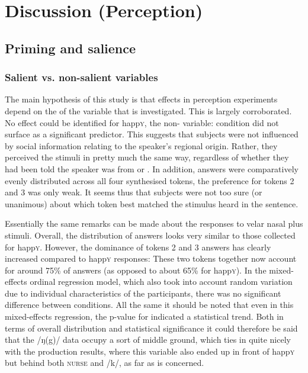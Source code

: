 	\chapter{Discussion (Perception)}
	\label{ch.perc_disc}

	\section{Priming and salience}
		\label{sec.perc_res.disc.salience}

		\subsection{Salient vs. non-salient variables}
		
The main hypothesis of this study is that  effects in perception experiments depend on the  of the variable that is investigated.
This is largely corroborated.
No  effect could be identified for happ\textsc{y}, the non-  variable:  condition did not surface as a significant predictor.
This suggests that subjects were not influenced by social information relating to the speaker's regional origin.
Rather, they perceived the stimuli in pretty much the same way, regardless of whether they had been told the speaker was from  or .
In addition, answers were comparatively evenly distributed across all four synthesised tokens, the preference for tokens 2 and 3 was only weak.
It seems thus that subjects were not too sure (or unanimous) about which token best matched the stimulus heard in the sentence.

Essentially the same remarks can be made about the responses to velar nasal plus stimuli.
Overall, the distribution of answers looks very similar to those collected for happ\textsc{y}.
However, the dominance of tokens 2 and 3 answers has clearly increased compared to happ\textsc{y} responses: These two tokens together now account for around 75\% of answers (as opposed to about 65\% for happ\textsc{y}).
In the mixed-effects ordinal regression model, which also took into account random variation due to individual characteristics of the participants, there was no significant difference between  conditions.
All the same it should be noted that even in this mixed-effects regression, the p-value for  indicated a statistical trend.
Both in terms of overall distribution and statistical significance it could therefore be said that the /ŋ(g)/ data occupy a sort of middle ground, which ties in quite nicely with the production results, where this variable also ended up in front of happ\textsc{y} but behind both \textsc{nurse} and /k/, as far as  is concerned.

